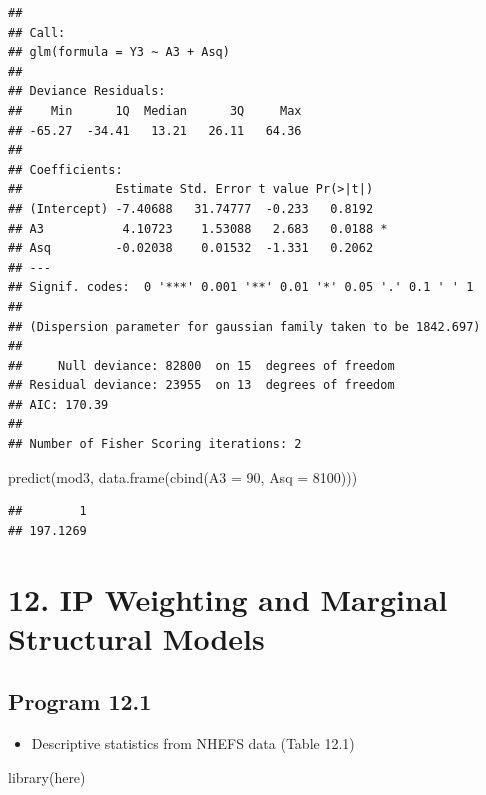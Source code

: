 \documentclass[
  10pt,
]{book}
\newenvironment{Shaded}{\begin{snugshade}}{\end{snugshade}}
\newcommand{\AttributeTok}[1]{\textcolor[rgb]{0.77,0.63,0.00}{#1}}
\newcommand{\DecValTok}[1]{\textcolor[rgb]{0.00,0.00,0.81}{#1}}
\newcommand{\FunctionTok}[1]{\textcolor[rgb]{0.00,0.00,0.00}{#1}}
\newcommand{\NormalTok}[1]{#1}
\providecommand{\tightlist}{%
  \setlength{\itemsep}{0pt}\setlength{\parskip}{0pt}}
\begin{document}
\begin{verbatim}
## 
## Call:
## glm(formula = Y3 ~ A3 + Asq)
## 
## Deviance Residuals: 
##    Min      1Q  Median      3Q     Max  
## -65.27  -34.41   13.21   26.11   64.36  
## 
## Coefficients:
##             Estimate Std. Error t value Pr(>|t|)  
## (Intercept) -7.40688   31.74777  -0.233   0.8192  
## A3           4.10723    1.53088   2.683   0.0188 *
## Asq         -0.02038    0.01532  -1.331   0.2062  
## ---
## Signif. codes:  0 '***' 0.001 '**' 0.01 '*' 0.05 '.' 0.1 ' ' 1
## 
## (Dispersion parameter for gaussian family taken to be 1842.697)
## 
##     Null deviance: 82800  on 15  degrees of freedom
## Residual deviance: 23955  on 13  degrees of freedom
## AIC: 170.39
## 
## Number of Fisher Scoring iterations: 2
\end{verbatim}

\begin{Shaded}
\begin{Highlighting}[]
\FunctionTok{predict}\NormalTok{(mod3, }\FunctionTok{data.frame}\NormalTok{(}\FunctionTok{cbind}\NormalTok{(}\AttributeTok{A3 =} \DecValTok{90}\NormalTok{, }\AttributeTok{Asq =} \DecValTok{8100}\NormalTok{)))}
\end{Highlighting}
\end{Shaded}

\begin{verbatim}
##        1 
## 197.1269
\end{verbatim}

\hypertarget{ip-weighting-and-marginal-structural-models}{%
\chapter*{12. IP Weighting and Marginal Structural Models}\label{ip-weighting-and-marginal-structural-models}}

\hypertarget{program-12.1}{%
\section{Program 12.1}\label{program-12.1}}

\begin{itemize}
\tightlist
\item
  Descriptive statistics from NHEFS data (Table 12.1)
\end{itemize}

\begin{Shaded}
\begin{Highlighting}[]
\FunctionTok{library}\NormalTok{(here)}
\end{Highlighting}
\end{Shaded}
\end{document}
